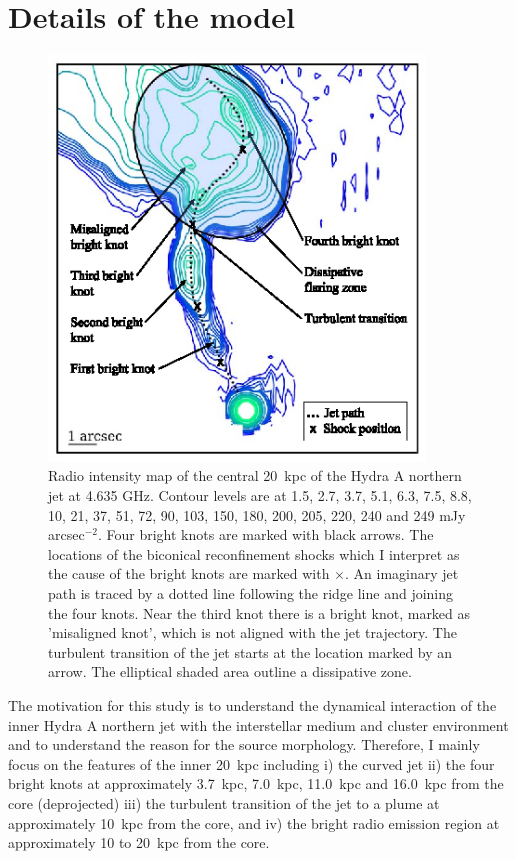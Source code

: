 \section{Details of the model}\label{s:model}
\begin{figure}
\centering
\includegraphics[width=10cm]{fig1.eps}
\caption{Radio intensity map of the central 20~kpc of the Hydra A northern jet at 4.635 GHz. Contour levels are at 1.5, 2.7, 3.7, 5.1, 6.3, 7.5, 8.8, 10, 21, 37, 51, 72, 90, 103, 150, 180, 200, 205, 220, 240 and 249 mJy arcsec$^{-2}$. Four bright knots are marked with black arrows. The locations of the biconical reconfinement shocks which I interpret as the cause of the bright knots \citep{nawaz14a} are marked with $\times$. An imaginary jet path is traced by a dotted line following the ridge line and joining the four knots. Near the third knot there is a bright knot, marked as 'misaligned knot', which is not aligned with the jet trajectory. The turbulent transition of the jet starts at the location marked by an arrow. The elliptical shaded area outline a dissipative zone.}
\label{f:obs}
\end{figure}

The motivation for this study is to understand the dynamical interaction of the inner Hydra A northern jet with the interstellar medium and cluster environment and to understand the reason for the source morphology. Therefore, I mainly focus on the features of the inner 20~kpc including i) the curved jet ii) the four bright knots at approximately 3.7~kpc, 7.0~kpc, 11.0~kpc and 16.0~kpc from the core (deprojected) iii) the turbulent transition of the jet to a plume at approximately 10~kpc from the core, and iv) the bright radio emission region at approximately 10 to 20~kpc from the core. 

